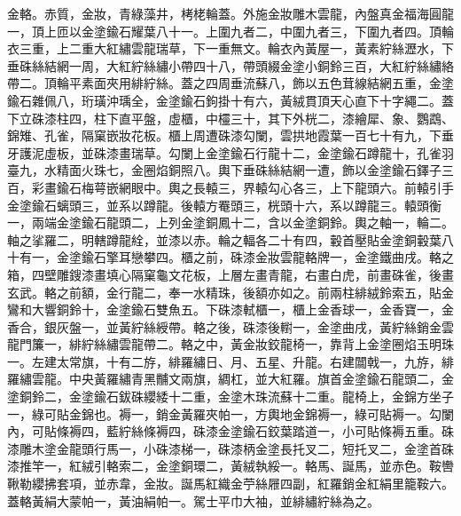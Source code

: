 \begin{pinyinscope}
 金輅。赤質，金妝，青綠藻井，栲栳輪蓋。外施金妝雕木雲龍，內盤真金福海圓龍一，頂上匝以金塗鍮石耀葉八十一。上圍九者二，中圍九者三，下圍九者四。頂輪衣三重，上二重大紅繡雲龍瑞草，下一重無文。輪衣內黃屋一，黃素紵絲瀝水，下垂硃絲結網一周，大紅紵絲繡小帶四十八，帶頭綴金塗小銅鈴三百，大紅紵絲繡絡帶二。頂輪平素面夾用緋紵絲。蓋之四周垂流蘇八，飾以五色茸線結網五重，金塗鍮石雜佩八，珩璜沖瑀全，金塗鍮石鉤掛十有六，黃絨貫頂天心直下十字繩二。蓋下立硃漆柱四，柱下直平盤，虛櫃，中欞三十，其下外桄二，漆繪犀、象、鸚鵡、錦雉、孔雀，隔窠嵌妝花板。櫃上周遭硃漆勾闌，雲拱地霞葉一百七十有九，下垂牙護泥虛板，並硃漆畫瑞草。勾闌上金塗鍮石行龍十二，金塗鍮石蹲龍十，孔雀羽臺九，水精面火珠七，金圈焰銅照八。輿下垂硃絲結網一遭，飾以金塗鍮石鐸子三百，彩畫鍮石梅萼嵌網眼中。輿之長轅三，界轅勾心各三，上下龍頭六。前轅引手金塗鍮石螭頭三，並系以蹲龍。後轅方罨頭三，桄頭十六，系以蹲龍三。轅頭衡一，兩端金塗鍮石龍頭二，上列金塗銅鳳十二，含以金塗銅鈴。輿之軸一，輪二。軸之挲羅二，明轄蹲龍絟，並漆以赤。輪之輻各二十有四，轂首壓貼金塗銅轂葉八十有一，金塗鍮石擎耳戀攀四。櫃之前，硃漆金妝雲龍輅牌一，金塗鐵曲戌。輅之箱，四壁雕鎪漆畫填心隔窠龜文花板，上層左畫青龍，右畫白虎，前畫硃雀，後畫玄武。輅之前額，金行龍二，奉一水精珠，後額亦如之。前兩柱緋絨鈴索五，貼金鸞和大響銅鈴十，金塗鍮石雙魚五。下硃漆軾櫃一，櫃上金香球一，金香寶一，金香合，銀灰盤一，並黃紵絲綬帶。輅之後，硃漆後轛一，金塗曲戌，黃紵絲銷金雲龍門簾一，緋紵絲繡雲龍帶二。輅之中，黃金妝鉸龍椅一，靠背上金塗圈焰玉明珠一。左建太常旗，十有二斿，緋羅繡日、月、五星、升龍。右建闒戟一，九斿，緋羅繡雲龍。中央黃羅繡青黑黼文兩旗，綢杠，並大紅羅。旗首金塗鍮石龍頭二，金塗銅鈴二，金塗鍮石鈸硃纓緌十二重，金塗木珠流蘇十二重。龍椅上，金錦方坐子一，綠可貼金錦也。褥一，銷金黃羅夾帕一，方輿地金錦褥一，綠可貼褥一。勾闌內，可貼條褥四，藍紵絲條褥四，硃漆金塗鍮石鉸葉踏道一，小可貼條褥五重。硃漆雕木塗金龍頭行馬一，小硃漆梯一，硃漆柄金塗長托叉二，短托叉二，金塗首硃漆推竿一，紅絨引輅索二，金塗銅環二，黃絨執綏一。輅馬、誕馬，並赤色。鞍轡鞦勒纓拂套項，並赤韋，金妝。誕馬紅織金苧絲屜四副，紅羅銷金紅絹里籠鞍六。蓋輅黃絹大蒙帕一，黃油絹帕一。駕士平巾大袖，並緋繡紵絲為之。




\end{pinyinscope}
